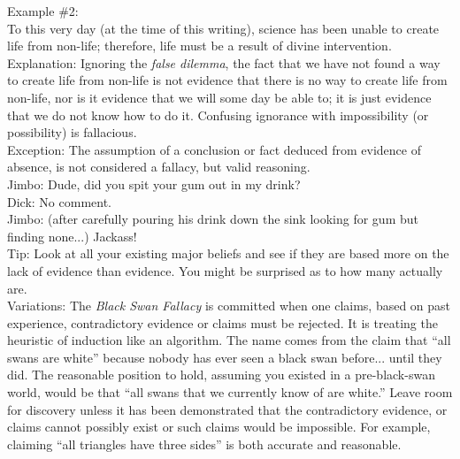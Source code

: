 \documentclass[a4paper,12pt,single,pdftex]{scrartcl}
\begin{document}
{    
      Example \#2: 
    \\

    
      To this very day (at the time of this writing), science has been unable to create life from non-life; therefore, life must be a result of divine intervention.
    \\

    
      Explanation: Ignoring the {\it false dilemma}, the fact that we have not found a way to create life from non-life is not evidence that there is no way to create life from non-life, nor is it evidence that we will some day be able to; it is just evidence that we do not know how to do it.  Confusing ignorance with impossibility (or possibility) is fallacious.
    \\

    
      Exception: The assumption of a conclusion or fact deduced from evidence of absence, is not considered a fallacy, but valid reasoning. 
    \\

    
      Jimbo: Dude, did you spit your gum out in my drink?
    \\

    
      Dick: No comment.
    \\

    
      Jimbo: (after carefully pouring his drink down the sink looking for gum but finding none...)  Jackass!
    \\

    
      Tip: Look at all your existing major beliefs and see if they are based more on the lack of evidence than evidence.  You might be surprised as to how many actually are.
    \\

    
      Variations: The {\em Black Swan Fallacy} is committed when one claims, based on past experience, contradictory evidence or claims must be rejected. It is treating the heuristic of induction like an algorithm. The name comes from the claim that “all swans are white” because nobody has ever seen a black swan before... until they did. The reasonable position to hold, assuming you existed in a pre-black-swan world, would be that “all swans that we currently know of are white.” Leave room for discovery unless it has been demonstrated that the contradictory evidence, or claims cannot possibly exist or such claims would be impossible. For example, claiming “all triangles have three sides” is both accurate and reasonable.
    \\

}
\end{document}
